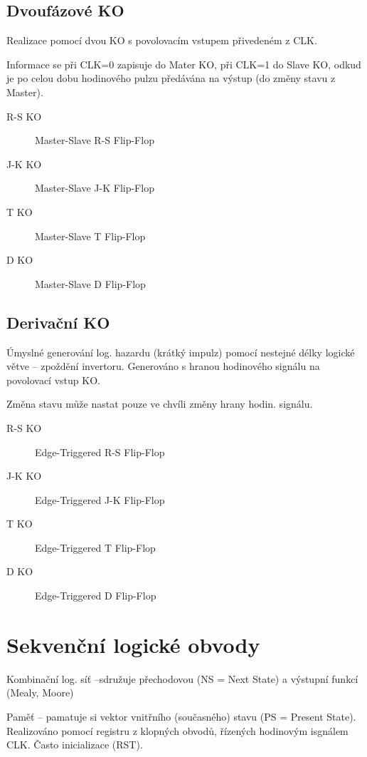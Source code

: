 \documentclass[a4wide]{report}
\begin{document}
\subsection{Dvoufázové KO}

Realizace pomocí dvou KO s povolovacím vstupem přivedeném z CLK.

Informace se při CLK=0 zapisuje do Mater KO, při CLK=1 do Slave KO, odkud je po celou dobu hodinového pulzu předávána na výstup (do změny stavu z Master).

\begin{description}
	\item[R-S KO] Master-Slave R-S Flip-Flop
	\item[J-K KO] Master-Slave J-K Flip-Flop
	\item[T KO] Master-Slave T Flip-Flop
	\item[D KO] Master-Slave D Flip-Flop
\end{description}

\subsection{Derivační KO}

Úmyslné generování log. hazardu (krátký impulz) pomocí nestejné délky logické větve -- zpoždění invertoru. Generováno s hranou hodinového signálu na povolovací vstup KO.

Změna stavu může nastat pouze ve chvíli změny hrany hodin. signálu.

\begin{description}
	\item[R-S KO] Edge-Triggered R-S Flip-Flop
	\item[J-K KO] Edge-Triggered J-K Flip-Flop
	\item[T KO] Edge-Triggered T Flip-Flop
	\item[D KO] Edge-Triggered D Flip-Flop
\end{description}


\section{Sekvenční logické obvody}
	
Kombinační log. síť --sdružuje přechodovou (NS = Next State) a výstupní funkcí (Mealy, Moore)

Paměť -- pamatuje si vektor vnitřního (současného) stavu (PS = Present State). Realizováno pomocí registru z klopných obvodů, řízených hodinovým isgnálem CLK. Často inicializace (RST).
\end{document}
